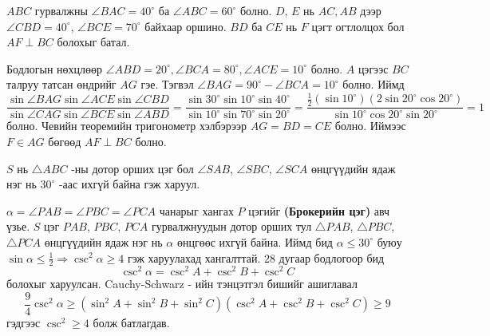 \documentclass[10pt,a4paper,oneside]{book}
\begin{document}
\Problem

\Problem
[Canada 1998] $ABC$ гурвалжны $\angle BAC=40^\circ$ ба $\angle ABC = 60^\circ$ болно. $D$, $E$ нь $AC, AB$ дээр  $\angle CBD=40^\circ$, $\angle BCE=70^\circ$ байхаар оршино. $BD$ ба $CE$ нь $F$ цэгт огтлолцох бол $AF\perp BC$ болохыг батал.

\TheSolution
Бодлогын нөхцлөөр $\angle ABD = 20^\circ, \angle BCA = 80^\circ, \angle ACE = 10^\circ$ болно. $A$ цэгээс $BC$ талруу татсан өндрийг $AG$ гэе. Тэгвэл $\angle BAG = 90^\circ - \angle BCA = 10^\circ$ болно. Иймд
\begin{equation*}
\frac{\sin \angle BAG \sin \angle ACE \sin \angle CBD}{\sin \angle CAG \sin \angle BCE \sin \angle ABD} = 
\frac{\sin 30^\circ \sin 10^\circ \sin 40^\circ}{\sin 10^\circ \sin 70^\circ \sin 20^\circ}
= \frac{\frac{1}{2}(\sin 10^\circ)(2\sin 20^\circ \cos 20^\circ)}{\sin 10^\circ \cos 20^\circ \sin 20^\circ} = 1
\end{equation*}
болно. Чевийн теоремийн тригонометр хэлбэрээр $AG=BD=CE$ болно. Иймээс $F \in AG$ бөгөөд $AF \perp BC$ болно.


\Problem
[IMO 1991] $S$ нь $\triangle ABC$ -ны дотор орших цэг бол $\angle SAB$, $\angle SBC$, $\angle SCA$ өнцгүүдийн ядаж нэг нь $30^\circ$ -аас ихгүй байна гэж харуул.

\ASolution
$\alpha =\angle PAB = \angle PBC = \angle PCA$ чанарыг хангах $P$ цэгийг \textbf{(Брокерийн цэг)} авч үзье. $S$ цэг $PAB$, $PBC$, $PCA$ гурвалжнуудын дотор орших тул $\triangle PAB$, $\triangle PBC$, $\triangle PCA$ өнцгүүдийн ядаж нэг нь $\alpha$ өнцгөөс ихгүй байна. Иймд бид $\alpha \leq 30^\circ$ буюу $\sin \alpha \leq \frac{1}{2} \Rightarrow \csc^2 \alpha \geq 4$ гэж харуулахад хангалттай. 28 дугаар бодлогоор бид
\begin{equation*}
\csc^2 \alpha = \csc^2 A + \csc^2 B + \csc^2 C
\end{equation*}
болохыг харуулсан. Cauchy-Schwarz - ийн тэнцэтгэл бишийг ашиглавал
\begin{equation*}
\frac{9}{4}\csc^2 \alpha \geq (\sin^2 A + \sin^2 B + \sin^2 C)(\csc^2 A + \csc^2 B + \csc^2 C)\geq 9
\end{equation*}
гэдгээс $\csc^2 \geq 4$ болж батлагдав.
\end{document}
